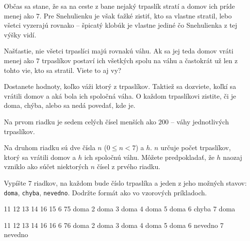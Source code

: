 




Občas sa stane, že sa na ceste z bane nejaký trpaslík stratí a domov ich príde menej ako $7$. Pre
Snehulienku je však ťažké zistiť, kto sa vlastne stratil, lebo všetci vyzerajú rovnako -- špicatý
klobúk je vlastne jediné čo Snehulienka z tej výšky vidí.

Našťastie, nie všetci trpaslíci majú rovnakú váhu. Ak sa jej teda domov vráti menej ako $7$
trpaslíkov postaví ich všetkých spolu na váhu a častokrát už len z tohto vie, kto sa stratil. Viete
to aj vy?


Dostanete hodnoty, koľko váži ktorý z trpaslíkov. Taktiež sa dozviete, koľkí sa vrátili domov a aká
bola ich spoločná váha. O každom trpaslíkovi zistite, či je doma, chýba, alebo sa nedá povedať, kde
je.


Na prvom riadku je sedem celých čísel menších ako $200$ -- váhy jednotlivých trpaslíkov.

Na druhom riadku sú dve čísla $n$ ($0 \leq n < 7$) a $h$. $n$ určuje počet trpaslíkov, ktorý sa
vrátili domov a $h$ ich spoločnú váhu. Môžete predpokladať, že $h$ naozaj vzniklo ako súčet
niektorých $n$ čísel z prvého riadku.


Vypíšte $7$ riadkov, na každom bude číslo trpaslíka a jeden z jeho možných stavov: \texttt{doma},
\texttt{chyba}, \texttt{nevedno}. Dodržte formát ako vo vzorových príkladoch.


 11 12 13 14 16 15
6 75
 doma
2 doma
3 doma
4 doma
5 doma
6 chyba
7 doma
\koniec

 11 12 13 14 16 16
6 76
 doma
2 doma
3 doma
4 doma
5 doma
6 nevedno
7 nevedno
\koniec


